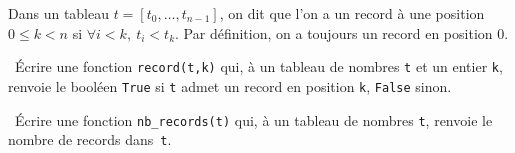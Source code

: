 \exer{}
\setcounter{numques}{0}

Dans un tableau $t = [t_0,\dots,t_{n-1}]$, on dit que l'on a un record à une position $0 \leq k < n$ si $\forall i < k,~ t_i < t_k$. 
Par définition, on a toujours un record en position 0.


\question\ \'Ecrire une fonction \texttt{record(t,k)} qui, à un tableau de nombres \texttt{t} et un entier \texttt{k}, renvoie le booléen \texttt{True} si \texttt{t} admet un record en position \texttt{k}, \texttt{False} sinon.

\question\ \'Ecrire une fonction \texttt{nb\_records(t)} qui, à un tableau de nombres \texttt{t}, renvoie le nombre de records dans~\texttt{t}.